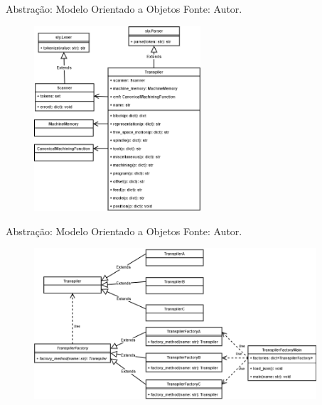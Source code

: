 \documentclass[aspectratio=169]{beamer}
\begin{document}
{\begin{frame}{Abstração: Modelo Orientado a Objetos}
  Fonte: Autor.
  \begin{figure}[H]
    \centering
    \includegraphics[width=6.2cm]{ncparser-class-transpiler.png}
  \end{figure}
\end{frame}


\begin{frame}{Abstração: Modelo Orientado a Objetos}
  Fonte: Autor.
  \begin{figure}[H]
    \centering
    \includegraphics[width=10.5cm]{ncparser-class-transpiler-factory.png}
  \end{figure}
\end{frame}


}
\end{document}
